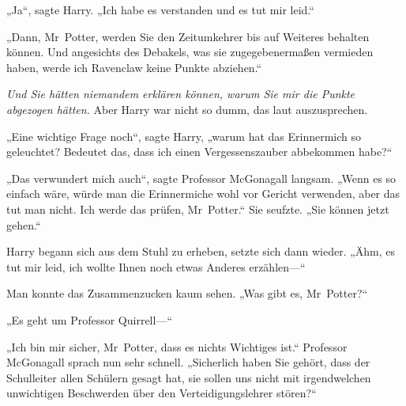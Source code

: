 „Ja“, sagte Harry. „Ich habe es verstanden und es tut mir leid.“

„Dann, Mr~Potter, werden Sie den Zeitumkehrer bis auf Weiteres behalten können. Und angesichts des Debakels, was sie zugegebenermaßen vermieden haben, werde ich Ravenclaw keine Punkte abziehen.“

\emph{Und Sie hätten niemandem erklären können, warum Sie mir die Punkte abgezogen hätten.} Aber Harry war nicht so dumm, das laut auszusprechen.

„Eine wichtige Frage noch“, sagte Harry, „warum hat das Erinnermich so geleuchtet? Bedeutet das, dass ich einen Vergessenszauber abbekommen habe?“

„Das verwundert mich auch“, sagte Professor McGonagall langsam. „Wenn es so einfach wäre, würde man die Erinnermiche wohl vor Gericht verwenden, aber das tut man nicht. Ich werde das prüfen, Mr~Potter.“ Sie seufzte. „Sie können jetzt gehen.“

Harry begann sich aus dem Stuhl zu erheben, setzte sich dann wieder. „Ähm, es tut mir leid, ich wollte Ihnen noch etwas Anderes erzählen—“

Man konnte das Zusammenzucken kaum sehen. „Was gibt es, Mr~Potter?“

„Es geht um Professor Quirrell—“

„Ich bin mir sicher, Mr~Potter, dass es nichts Wichtiges ist.“ Professor McGonagall sprach nun sehr schnell. „Sicherlich haben Sie gehört, dass der Schulleiter allen Schülern gesagt hat, sie sollen uns nicht mit irgendwelchen unwichtigen Beschwerden über den Verteidigungslehrer stören?“

